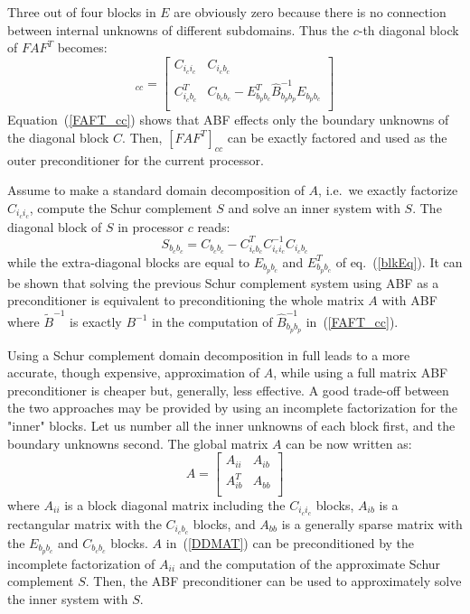 \documentclass{report}
\begin{document}
Three out of four blocks in $E$ are obviously zero because there is no
connection between internal
unknowns of different subdomains.
Thus the $c$-th diagonal block of $FAF^T$ becomes:
\begin{equation}
[FAF^T]_{cc} = \left[
\begin{array}{cc}
C_{i_c i_c} & C_{i_c b_c} \\
C_{i_c b_c}^T & C_{b_c b_c} - E_{b_p b_c}^T \hat{B}^{-1}_{b_p b_p} E_{b_p b_c} \\
\end{array}
\right]
\label{FAFT_cc}
\end{equation}
Equation~(\ref{FAFT_cc}) shows that ABF effects only the boundary
unknowns of the diagonal block $C$.
Then, $[FAF^T]_{cc}$ can be exactly factored and used as the outer
preconditioner for the current processor.

Assume to make a standard domain decomposition of $A$, i.e.~we exactly
factorize $C_{i_c i_c}$,
compute the Schur complement $S$ and solve an inner system with $S$.
The diagonal block of $S$ in processor $c$ reads:
\begin{equation}
S_{b_c b_c} = C_{b_c b_c} - C_{i_c b_c}^T C_{i_c i_c}^{-1} C_{i_c b_c}
\end{equation}
while the extra-diagonal blocks are equal to $E_{b_p b_c}$ and $E_{b_p
b_c}^T$ of eq.~(\ref{blkEq}).
It can be shown that solving the previous Schur complement system using
ABF as a preconditioner is equivalent
to preconditioning the whole matrix $A$ with ABF where $\tilde{B}^{-1}$
is exactly $B^{-1}$ in the computation
of $\hat{B}^{-1}_{b_p b_p}$ in~(\ref{FAFT_cc}).

Using a Schur complement domain decomposition in full leads to a more
accurate, though expensive,
approximation of $A$, while using a full matrix ABF preconditioner is
cheaper but, generally, less effective.
A good trade-off between the two approaches may be provided by using an
incomplete factorization for the "inner" blocks.
Let us number all the inner unknowns of each block first, and the
boundary unknowns second. The global
matrix $A$ can be now written as:
\begin{equation}
A = \left[
\begin{array}{cc}
A_{ii} & A_{ib} \\
A_{ib}^T & A_{bb} \\
\end{array}
\right]
\label{DDMAT}
\end{equation}
where $A_{ii}$ is a block diagonal matrix including the $C_{i_c i_c}$
blocks, $A_{ib}$ is a rectangular
matrix with the $C_{i_c b_c}$ blocks, and $A_{bb}$ is a generally sparse
matrix with the $E_{b_p b_c}$
and $C_{b_c b_c}$ blocks. $A$ in~(\ref{DDMAT}) can be preconditioned by
the incomplete factorization of
$A_{ii}$ and the computation of the approximate Schur complement $S$.
Then, the ABF preconditioner can be used to
approximately solve the inner system with $S$.
\end{document}
